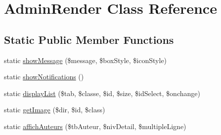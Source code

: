 \hypertarget{class_admin_render}{}\section{Admin\+Render Class Reference}
\label{class_admin_render}
\subsection*{Static Public Member Functions}
\begin{DoxyCompactItemize}
\item 
static \hyperlink{class_admin_render_adc1f972d938d9835c59c360e5438da21}{show\+Message} (\$message, \$box\+Style, \$icon\+Style)
\item 
static \hyperlink{class_admin_render_a9fecde2db4abfbac3f267a30909773b0}{show\+Notifications} ()
\item 
static \hyperlink{class_admin_render_aa4b338dc4c270f0ac8f6d0723f875908}{display\+List} (\$tab, \$classe, \$id, \$size, \$id\+Select, \$onchange)
\item 
static \hyperlink{class_admin_render_a7f3fdb71455a407c9a664085c7d93974}{get\+Image} (\$dir, \$id, \$class)
\item 
static \hyperlink{class_admin_render_aa7b6abdf75b62d9fb9cc7896e46687f1}{affich\+Auteurs} (\$tb\+Auteur, \$niv\+Detail, \$multiple\+Ligne)
\end{DoxyCompactItemize}

